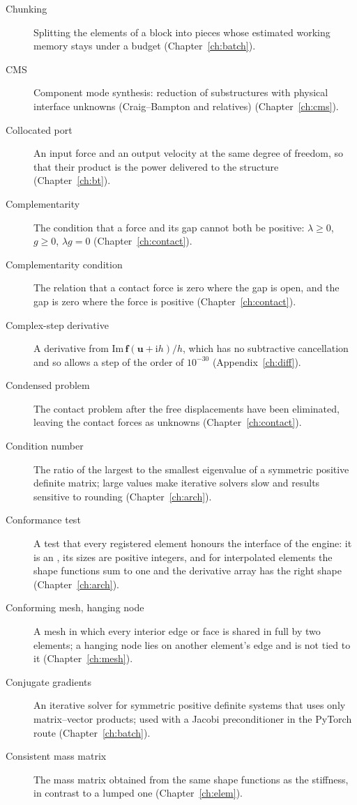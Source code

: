 \begin{description}
\item[Chunking] Splitting the elements of a block into pieces whose estimated working memory stays under a budget (Chapter~\ref{ch:batch}).
\item[CMS] Component mode synthesis: reduction of substructures with physical interface unknowns (Craig--Bampton and relatives) (Chapter~\ref{ch:cms}).
\item[Collocated port] An input force and an output velocity at the same degree of freedom, so that their product is the power delivered to the structure (Chapter~\ref{ch:bt}).
\item[Complementarity] The condition that a force and its gap cannot both be positive: $\lambda\ge0$, $g\ge0$, $\lambda g=0$ (Chapter~\ref{ch:contact}).
\item[Complementarity condition] The relation that a contact force is zero where the gap is open, and the gap is zero where the force is positive (Chapter~\ref{ch:contact}).
\item[Complex-step derivative] A derivative from $\mathrm{Im}\,\bm f(\bm u+\mathrm i h)/h$, which has no subtractive cancellation and so allows a step of the order of $10^{-30}$ (Appendix~\ref{ch:diff}).
\item[Condensed problem] The contact problem after the free displacements have been eliminated, leaving the contact forces as unknowns (Chapter~\ref{ch:contact}).
\item[Condition number] The ratio of the largest to the smallest eigenvalue of a symmetric positive definite matrix; large values make iterative solvers slow and results sensitive to rounding (Chapter~\ref{ch:arch}).
\item[Conformance test] A test that every registered element honours the interface of the engine: it is an , its sizes are positive integers, and for interpolated elements the shape functions sum to one and the derivative array has the right shape (Chapter~\ref{ch:arch}).
\item[Conforming mesh, hanging node] A mesh in which every interior edge or face is shared in full by two elements; a hanging node lies on another element's edge and is not tied to it (Chapter~\ref{ch:mesh}).
\item[Conjugate gradients] An iterative solver for symmetric positive definite systems that uses only matrix--vector products; used with a Jacobi preconditioner in the PyTorch route (Chapter~\ref{ch:batch}).
\item[Consistent mass matrix] The mass matrix obtained from the same shape functions as the stiffness, in contrast to a lumped one (Chapter~\ref{ch:elem}).

\end{description}
